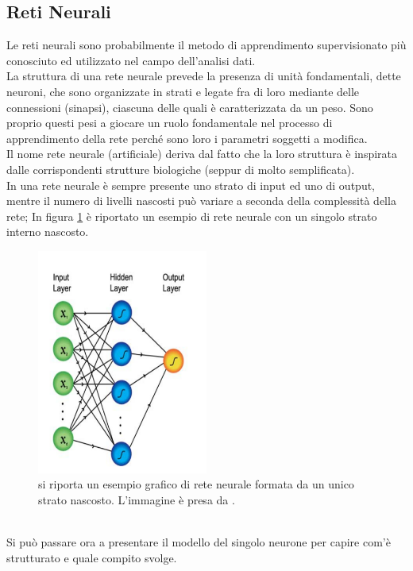 \newpage

\subsection{Reti Neurali}
\label{reti neurali}
Le reti neurali sono probabilmente il metodo di apprendimento supervisionato più conosciuto ed utilizzato nel campo dell'analisi dati. \\
La struttura di una rete neurale prevede la presenza di unità fondamentali, dette neuroni, che sono organizzate in strati e legate fra di loro mediante delle connessioni (sinapsi), ciascuna delle quali è caratterizzata da un peso. Sono proprio questi pesi a giocare un ruolo fondamentale nel processo di apprendimento della rete perché sono loro i parametri soggetti a modifica.\\
Il nome rete neurale (artificiale) deriva dal fatto che la loro struttura è inspirata dalle corrispondenti strutture biologiche (seppur di molto semplificata). \\
In una rete neurale è sempre presente uno strato di input ed uno di output, mentre il numero di livelli nascosti può variare a seconda della complessità della rete; In figura \ref{fig:schemaNN} è riportato un esempio di rete neurale con un singolo strato interno nascosto.
\begin{figure}[h!]
	\centering
	\includegraphics[width=0.50\textwidth]{figs/schemaNN.png}
	\caption{si riporta un esempio grafico di rete neurale formata da un unico strato nascosto. L'immagine è presa da \cite{Metodi_multivariati}.}
	\label{fig:schemaNN}
\end{figure}
\\
Si può passare ora a presentare il modello del singolo neurone per capire com'è strutturato e quale compito svolge.
